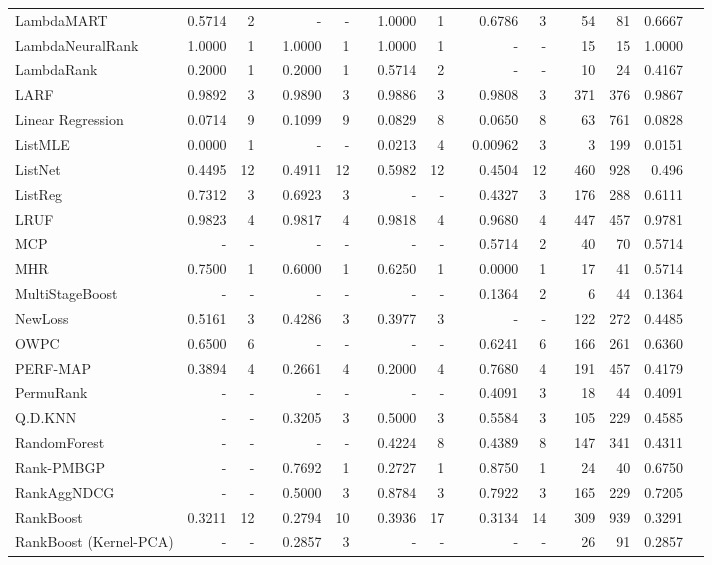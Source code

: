 \documentclass{sig-alternate}
\begin{document}
{\begin{longtable}[!hpt]{@{}lrrrrrrrrrrrrrrrr@{}}
LambdaMART & 0.5714 & 2 && - & - && 1.0000 & 1 && 0.6786 & 3 && 54 & 81 & 0.6667 \\
LambdaNeuralRank & 1.0000 & 1 && 1.0000 & 1 && 1.0000 & 1 && - & - && 15 & 15 & 1.0000 \\
LambdaRank & 0.2000 & 1 && 0.2000 & 1 && 0.5714 & 2 && - & - && 10 & 24 & 0.4167 \\
LARF & 0.9892 & 3 && 0.9890 & 3 && 0.9886 & 3 && 0.9808 & 3 && 371 & 376 & 0.9867 \\
Linear Regression & 0.0714 & 9 && 0.1099 & 9 && 0.0829 & 8 && 0.0650 & 8 && 63 & 761 & 0.0828 \\
ListMLE & 0.0000 & 1 && - & - && 0.0213 & 4 && 0.00962 & 3 && 3 & 199 & 0.0151 \\
ListNet & 0.4495 & 12 && 0.4911 & 12 && 0.5982 & 12 && 0.4504 & 12 && 460 & 928 & 0.496 \\
ListReg & 0.7312 & 3 && 0.6923 & 3 && - & - && 0.4327 & 3 && 176 & 288 & 0.6111 \\
LRUF & 0.9823 & 4 && 0.9817 & 4 && 0.9818 & 4 && 0.9680 & 4 && 447 & 457 & 0.9781 \\
MCP & - & - && - & - && - & - && 0.5714 & 2 && 40 & 70 & 0.5714 \\
MHR & 0.7500 & 1 && 0.6000 & 1 && 0.6250 & 1 && 0.0000 & 1 && 17 & 41 & 0.5714 \\
MultiStageBoost & - & - && - & - && - & - && 0.1364 & 2 && 6 & 44 & 0.1364 \\
NewLoss & 0.5161 & 3 && 0.4286 & 3 && 0.3977 & 3 && - & - && 122 & 272 & 0.4485 \\
OWPC & 0.6500 & 6 && - & - && - & - && 0.6241 & 6 && 166 & 261 & 0.6360 \\
PERF-MAP & 0.3894 & 4 && 0.2661 & 4 && 0.2000 & 4 && 0.7680 & 4 && 191 & 457 & 0.4179 \\
PermuRank & - & - && - & - && - & - && 0.4091 & 3 && 18 & 44 & 0.4091 \\
Q.D.KNN & - & - && 0.3205 & 3 && 0.5000 & 3 && 0.5584 & 3 && 105 & 229 & 0.4585 \\
RandomForest & - & - && - & - && 0.4224 & 8 && 0.4389 & 8 && 147 & 341 & 0.4311 \\
Rank-PMBGP & - & - && 0.7692 & 1 && 0.2727 & 1 && 0.8750 & 1 && 24 & 40 & 0.6750 \\
RankAggNDCG & - & - && 0.5000 & 3 && 0.8784 & 3 && 0.7922 & 3 && 165 & 229 & 0.7205 \\
RankBoost & 0.3211 & 12 && 0.2794 & 10 && 0.3936 & 17 && 0.3134 & 14 && 309 & 939 & 0.3291 \\
RankBoost (Kernel-PCA) & - & - && 0.2857 & 3 && - & - && - & - && 26 & 91 & 0.2857 \\

\end{longtable}}
\end{document}
